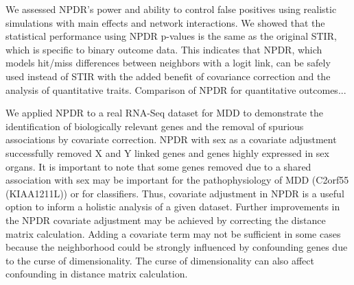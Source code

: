 \documentclass[10pt]{article}
\begin{document}
We assessed NPDR's power and ability to control false positives using realistic simulations with main effects and network interactions. We showed that the statistical performance using NPDR p-values is the same as the original STIR, which is specific to binary outcome data. This indicates that NPDR, which models hit/miss differences between neighbors with a logit link, can be safely used instead of STIR with the added benefit of covariance correction and the analysis of quantitative traits. Comparison of NPDR for quantitative outcomes... 

We applied NPDR to a real RNA-Seq dataset for MDD to demonstrate the identification of biologically relevant genes and the removal of spurious associations by covariate correction. NPDR with sex as a covariate adjustment successfully removed X and Y linked genes and genes highly expressed in sex organs. It is important to note that some genes removed due to a shared association with sex may be important for the pathophysiology of MDD (C2orf55 (KIAA1211L)) or for classifiers.  Thus, covariate adjustment in NPDR is a useful option to inform a holistic analysis of a given dataset. Further improvements in the NPDR covariate adjustment may be achieved by correcting the distance matrix calculation. Adding a covariate term may not be sufficient in some cases because the neighborhood could be strongly influenced by confounding genes due to the curse of dimensionality. The curse of dimensionality can also affect confounding in distance matrix calculation.



%
\end{document}

